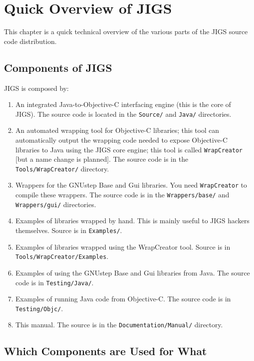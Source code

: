 \chapter{Quick Overview of JIGS}

This chapter is a quick technical overview of the various parts of the
JIGS source code distribution.

\section{Components of JIGS}
JIGS is composed by: 
\begin{enumerate}
\item An integrated Java-to-Objective-C interfacing engine (this is
the core of JIGS).  The source code is located in the \texttt{Source/}
and \texttt{Java/} directories.
\item An automated wrapping tool for Objective-C libraries; this tool
can automatically output the wrapping code needed to expose
Objective-C libraries to Java using the JIGS core engine; this tool is
called \texttt{WrapCreator} [but a name change is planned].  The
source code is in the \texttt{Tools/WrapCreator/} directory.
\item Wrappers for the GNUstep Base and Gui libraries.  You need
\texttt{WrapCreator} to compile these wrappers.  The source code is in
the \texttt{Wrappers/base/} and \texttt{Wrappers/gui/} directories.
\item Examples of libraries wrapped by hand.  This is mainly useful 
to JIGS hackers themselves.  Source is in \texttt{Examples/}.
\item Examples of libraries wrapped using the WrapCreator tool.  Source 
is in \texttt{Tools/WrapCreator/Examples}.
\item Examples of using the GNUstep Base and Gui libraries from Java.
The source code is in \texttt{Testing/Java/}.
\item Examples of running Java code from Objective-C.  The source code 
is in \texttt{Testing/Objc/}.
\item This manual.  The source is in the \texttt{Documentation/Manual/} 
directory.
\end{enumerate}

\section{Which Components are Used for What}

